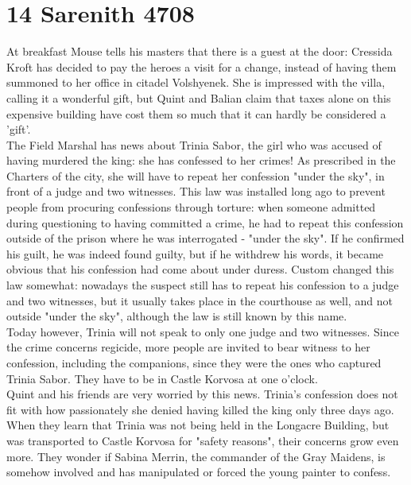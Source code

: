 \section{14 Sarenith 4708}

At breakfast Mouse tells his masters that there is a guest at the door: Cressida Kroft has decided to pay the heroes a visit for a change, instead of having them summoned to her office in citadel Volshyenek. She is impressed with the villa, calling it a wonderful gift, but Quint and Balian claim that taxes alone on this expensive building have cost them so much that it can hardly be considered a 'gift'.\\

The Field Marshal has news about Trinia Sabor, the girl who was accused of having murdered the king: she has confessed to her crimes! As prescribed in the Charters of the city, she will have to repeat her confession "under the sky", in front of a judge and two witnesses. This law was installed long ago to prevent people from procuring confessions through torture: when someone admitted during questioning to having committed a crime, he had to repeat this confession outside of the prison where he was interrogated - "under the sky". If he confirmed his guilt, he was indeed found guilty, but if he withdrew his words, it became obvious that his confession had come about under duress. Custom changed this law somewhat: nowadays the suspect still has to repeat his confession to a judge and two witnesses, but it usually takes place in the courthouse as well, and not outside "under the sky", although the law is still known by this name.\\

Today however, Trinia will not speak to only one judge and two witnesses. Since the crime concerns regicide, more people are invited to bear witness to her confession, including the companions, since they were the ones who captured Trinia Sabor. They have to be in Castle Korvosa at one o'clock.\\

Quint and his friends are very worried by this news. Trinia's confession does not fit with how passionately she denied having killed the king only three days ago. When they learn that Trinia was not being held in the Longacre Building, but was transported to Castle Korvosa for "safety reasons", their concerns grow even more. They wonder if Sabina Merrin, the commander of the Gray Maidens, is somehow involved and has manipulated or forced the young painter to confess.\\

